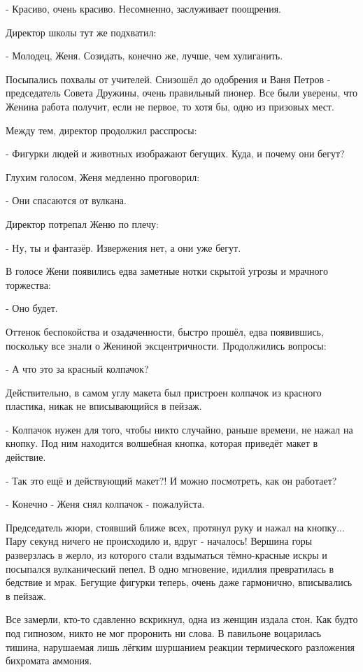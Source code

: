 - Красиво, очень красиво. Несомненно, заслуживает поощрения.

Директор школы тут же подхватил:

- Молодец, Женя. Созидать, конечно же, лучше, чем хулиганить.

Посыпались похвалы от учителей. Снизошёл до одобрения и Ваня Петров -
председатель Совета Дружины, очень правильный пионер. Все были уверены, что
Женина работа получит, если не первое, то хотя бы, одно из призовых мест.

Между тем, директор продолжил расспросы:

- Фигурки людей и животных изображают бегущих. Куда, и почему они бегут?

Глухим голосом, Женя медленно проговорил:

- Они спасаются от вулкана.

Директор потрепал Женю по плечу:

- Ну, ты и фантазёр. Извержения нет, а они уже бегут.

В голосе Жени появились едва заметные нотки скрытой угрозы и мрачного
торжества:

- Оно будет.

Оттенок беспокойства и озадаченности, быстро прошёл, едва появившись, поскольку
все знали о Жениной эксцентричности. Продолжились вопросы:

- А что это за красный колпачок?

Действительно, в самом углу макета был пристроен колпачок из красного пластика,
никак не вписывающийся в пейзаж.

- Колпачок нужен для того, чтобы никто случайно, раньше времени, не нажал на
кнопку. Под ним находится волшебная кнопка, которая приведёт макет в действие.

- Так это ещё и действующий макет?! И можно посмотреть, как он работает?

- Конечно - Женя снял колпачок - пожалуйста.

Председатель жюри, стоявший ближе всех, протянул руку и нажал на кнопку... Пару
секунд ничего не происходило и, вдруг - началось! Вершина горы разверзлась в
жерло, из которого стали вздыматься тёмно-красные искры и посыпался
вулканический пепел. В одно мгновение, идиллия превратилась в бедствие и мрак.
Бегущие фигурки теперь, очень даже гармонично, вписывались в пейзаж.

Все замерли, кто-то сдавленно вскрикнул, одна из женщин издала стон. Как будто
под гипнозом, никто не мог проронить ни слова. В павильоне воцарилась тишина,
нарушаемая лишь лёгким шуршанием реакции термического разложения бихромата
аммония.

